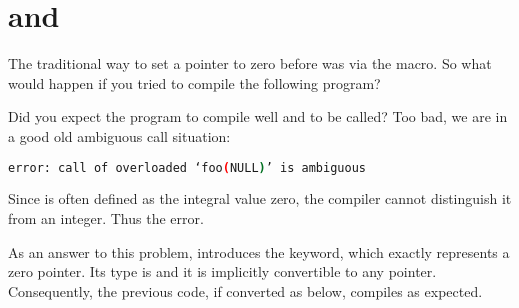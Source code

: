 \section{ and }

The traditional way to set a pointer to zero before  was via the
 macro. So what would happen if you tried to compile the
following program?



Did you expect the program to compile well and  to be
called? Too bad, we are in a good old ambiguous call situation:

\begin{lstlisting}[language=bash]
error: call of overloaded ‘foo(NULL)’ is ambiguous
\end{lstlisting}

Since  is often defined as the integral value zero, the
compiler cannot distinguish it from an integer. Thus the error.

\bigskip

As an answer to this problem,  introduces the 
keyword, which exactly represents a zero pointer. Its type is
 and it is implicitly convertible to any
pointer. Consequently, the previous code, if converted as below,
compiles as expected.


